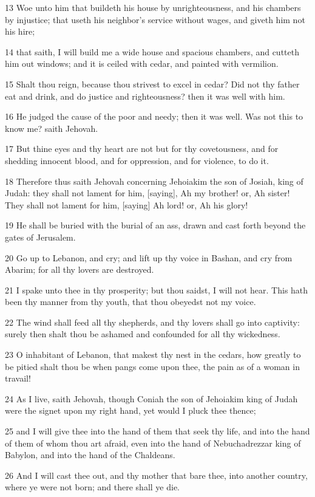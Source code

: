 \par 13 Woe unto him that buildeth his house by unrighteousness, and his chambers by injustice; that useth his neighbor's service without wages, and giveth him not his hire;
\par 14 that saith, I will build me a wide house and spacious chambers, and cutteth him out windows; and it is ceiled with cedar, and painted with vermilion.
\par 15 Shalt thou reign, because thou strivest to excel in cedar? Did not thy father eat and drink, and do justice and righteousness? then it was well with him.
\par 16 He judged the cause of the poor and needy; then it was well. Was not this to know me? saith Jehovah.
\par 17 But thine eyes and thy heart are not but for thy covetousness, and for shedding innocent blood, and for oppression, and for violence, to do it.
\par 18 Therefore thus saith Jehovah concerning Jehoiakim the son of Josiah, king of Judah: they shall not lament for him, [saying], Ah my brother! or, Ah sister! They shall not lament for him, [saying] Ah lord! or, Ah his glory!
\par 19 He shall be buried with the burial of an ass, drawn and cast forth beyond the gates of Jerusalem.
\par 20 Go up to Lebanon, and cry; and lift up thy voice in Bashan, and cry from Abarim; for all thy lovers are destroyed.
\par 21 I spake unto thee in thy prosperity; but thou saidst, I will not hear. This hath been thy manner from thy youth, that thou obeyedst not my voice.
\par 22 The wind shall feed all thy shepherds, and thy lovers shall go into captivity: surely then shalt thou be ashamed and confounded for all thy wickedness.
\par 23 O inhabitant of Lebanon, that makest thy nest in the cedars, how greatly to be pitied shalt thou be when pangs come upon thee, the pain as of a woman in travail!
\par 24 As I live, saith Jehovah, though Coniah the son of Jehoiakim king of Judah were the signet upon my right hand, yet would I pluck thee thence;
\par 25 and I will give thee into the hand of them that seek thy life, and into the hand of them of whom thou art afraid, even into the hand of Nebuchadrezzar king of Babylon, and into the hand of the Chaldeans.
\par 26 And I will cast thee out, and thy mother that bare thee, into another country, where ye were not born; and there shall ye die.
